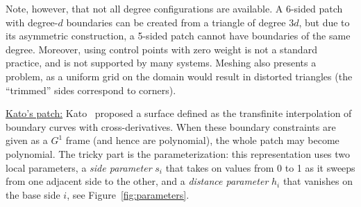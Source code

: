 \documentclass{article}
\begin{document}
Note, however, that not all degree configurations are available. A 6-sided patch with degree-$d$
boundaries can be created from a triangle of degree $3d$, but due to its asymmetric construction,
a 5-sided patch cannot have boundaries of the same degree. Moreover, using control points with zero
weight is not a standard practice, and is not supported by many systems. Meshing
also presents a problem, as a uniform grid on the domain would result in distorted triangles
(the ``trimmed'' sides correspond to corners).


\vspace{10pt}
\noindent\underline{Kato's patch:}\vspace{0.2em}\newline
Kato~\cite{kato} proposed a surface defined as the transfinite interpolation of boundary curves with
cross-derivatives. When these boundary constraints are given as a $G^1$ frame (and hence
are polynomial), the whole patch may become polynomial. The tricky part is the parameterization:
this representation uses two local parameters, a \emph{side parameter} $s_i$
that takes on values from 0 to 1 as it sweeps from one adjacent side to the other,
and a \emph{distance parameter} $h_i$ that vanishes on the base side $i$, see
Figure~\ref{fig:parameters}.
\end{document}
